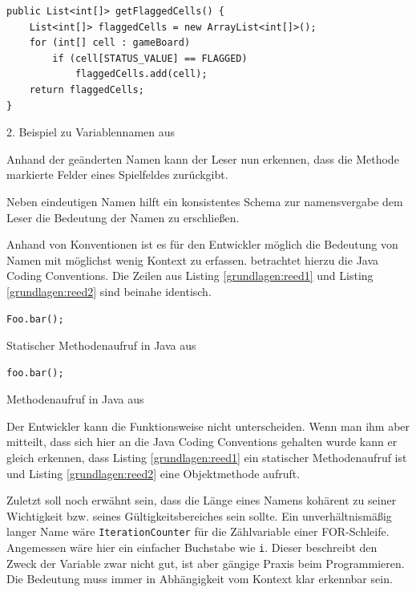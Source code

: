 \begin{listing}
    \begin{verbatim}
public List<int[]> getFlaggedCells() {
    List<int[]> flaggedCells = new ArrayList<int[]>();
    for (int[] cell : gameBoard)
        if (cell[STATUS_VALUE] == FLAGGED)
            flaggedCells.add(cell);
    return flaggedCells;
}
    \end{verbatim}
    \caption{2. Beispiel zu Variablennamen aus \cite[S. 47]{Martin}}
    \label{grundlagen:naminggood}
\end{listing}

Anhand der geänderten Namen kann der Leser nun erkennen, dass die Methode markierte Felder eines Spielfeldes zurückgibt.

Neben eindeutigen Namen hilft ein konsistentes Schema zur namensvergabe dem Leser die Bedeutung der Namen zu erschließen. 

Anhand von Konventionen ist es für den Entwickler möglich die Bedeutung von Namen mit möglichst wenig Kontext zu erfassen.
\cite{reed} betrachtet hierzu die Java Coding Conventions. Die Zeilen aus Listing \ref{grundlagen:reed1} und
Listing \ref{grundlagen:reed2} sind beinahe identisch. 

\begin{listing}
    \begin{verbatim}
Foo.bar();
    \end{verbatim}
    \caption{Statischer Methodenaufruf in Java aus \cite[S. 182]{reed}}
    \label{grundlagen:reed1}
\end{listing}

\begin{listing}
    \begin{verbatim}
foo.bar();
    \end{verbatim}
    \caption{Methodenaufruf in Java aus \cite[S. 182]{reed}}
    \label{grundlagen:reed2}
\end{listing}

Der Entwickler kann die Funktionsweise nicht unterscheiden.
Wenn man ihm aber mitteilt, dass sich hier an die Java Coding Conventions gehalten wurde kann er gleich erkennen,
dass Listing \ref{grundlagen:reed1} ein statischer Methodenaufruf ist und
Listing \ref{grundlagen:reed2} eine Objektmethode aufruft.

Zuletzt soll noch erwähnt sein, dass die Länge eines Namens kohärent zu seiner Wichtigkeit bzw. seines Gültigkeitsbereiches sein sollte.
Ein unverhältnismäßig langer Name wäre \texttt{IterationCounter} für die Zählvariable einer FOR-Schleife. Angemessen wäre hier ein einfacher Buchstabe wie \texttt{i}. Dieser beschreibt den Zweck der Variable zwar nicht gut, ist aber gängige Praxis beim Programmieren. Die Bedeutung muss immer in Abhängigkeit vom Kontext klar erkennbar sein.



